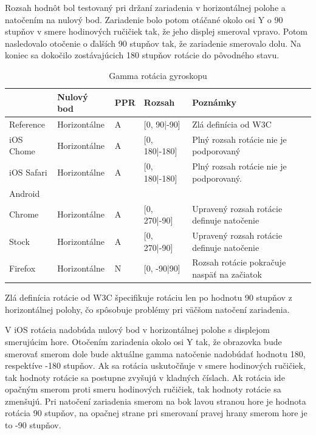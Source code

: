 Rozsah hodnôt bol testovaný pri držaní zariadenia v horizontálnej polohe a natočením na nulový bod. Zariadenie bolo potom otáčané okolo osi Y o 90 stupňov v smere hodinových ručičiek tak, že jeho displej smeroval vpravo. Potom nasledovalo otočenie o ďalších 90 stupňov tak, že zariadenie smerovalo dolu. Na koniec sa dokočilo zostávajúcich 180 stupňov rotácie do pôvodného stavu.

\begin{table}[H]
  \begin{tabular}{ | l | l | l | l | l |}
  \hline
              & Nulový bod    & PPR   & Rozsah         & Poznámky\\ \hline
  Reference   & Horizontálne   & A     & [0, 90|-90]   & Zlá definícia od W3C \\  
  iOS Chome   & Horizontálne   & A     & [0, 180|-180] & Plný rozsah rotácie nie je podporovaný \\  
  iOS Safari  & Horizontálne   & A     & [0, 180|-180] & Plný rozsah rotácie nie je podporovaný. \\  
  Android & & & & \\  
  Chrome      & Horizontálne   & A     & [0, 270|-90]  & Upravený rozsah rotácie definuje natočenie \\  
  Stock       & Horizontálne   & A     & [0, 270|-90]  & Upravený rozsah rotácie definuje natočenie \\  
  Firefox     & Horizontálne   & N     & [0, -90|90]   & Rozsah rotácie pokračuje naspäť na začiatok \\
  \hline
  \end{tabular}
  \caption[Gamma rotácia gyroskopu]{Gamma rotácia gyroskopu}
\end{table}

Zlá definícia rotácie od W3C špecifikuje rotáciu len po hodnotu 90 stupňov z horizontálnej polohy, čo spôsobuje problémy pri väčšom natočení zariadenia.

V iOS rotácia nadobúda nulový bod v horizontálnej polohe s displejom smerujúcim hore. Otočením zariadenia okolo osi Y tak, že obrazovka bude smerovať smerom dole bude aktuálne gamma natočenie nadobúdať hodnotu 180, respektíve -180 stupňov. Ak sa rotácia uskutočňuje v smere hodinových ručičiek, tak hodnoty rotácie sa postupne zvyšujú v kladných číslach. Ak rotácia ide opačným smerom proti smeru hodinových ručičiek, tak hodnoty rotácie sa zmenšujú. Pri natočení zariadenia smerom na bok lavou stranou hore je hodnota rotácia 90 stupňov, na opačnej strane pri smerovaní pravej hrany smerom hore je to -90 stupňov.

